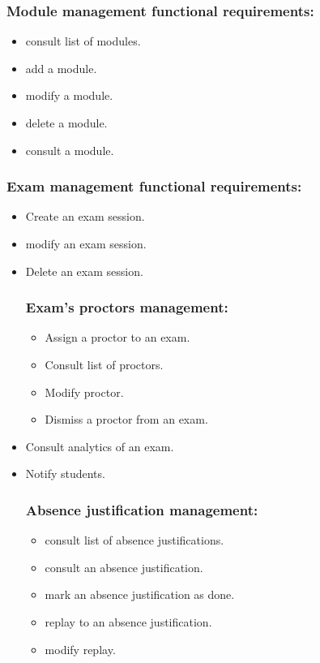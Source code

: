 \documentclass[a4paper,12p]{article}
\begin{document}
\begin{itemize}
\begin{itemize}
     \end{itemize}

     \subsubsection{Module management functional requirements:}
     \begin{itemize}
        \item consult list of modules.
        \item add a module.
        \item modify a module.
        \item delete a module.
        \item consult a module.
     \end{itemize}

     \subsubsection{Exam management functional requirements:}
     \begin{itemize}
        \item Create an exam session.
        \item modify an exam session.
        \item Delete an exam session.
        \subsubsection{Exam's proctors management:}
         \begin{itemize}
            \item Assign a proctor to an exam.
            \item Consult list of proctors.
            \item Modify proctor.
            \item Dismiss a proctor from an exam.
         \end{itemize}
         \item Consult analytics of an exam.
         \item Notify students.
         \subsubsection{Absence justification management:}
         \begin{itemize}
            \item consult list of absence justifications.
            \item consult an absence justification.
            \item mark an absence justification as done.
            \item replay to an absence justification.
            \item modify replay.
         \end{itemize}
     \end{itemize}


\end{itemize}
\end{document}
